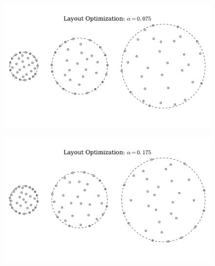 


\begin{figure}[htbp]
  \centering
  \includegraphics[width=\textwidth]{Figures/CircleLayoutL_0_075.pdf}
  \caption{\label{circ75L}}
\end{figure}

\begin{figure}[htbp]
  \centering
  \includegraphics[width=\textwidth]{Figures/CircleLayoutL_0_175.pdf}
  \caption{\label{circ175L}}
\end{figure}


